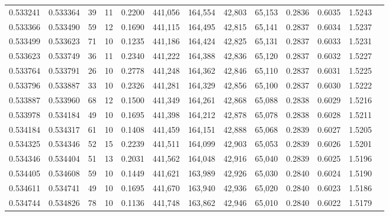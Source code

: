 \begin{tabular}{rrrrrrrrrrrrr}
0.533241 & 0.533364 &    39 &  11 &                                     0.2200 & 441,056 & 164,554 &  42,803 &  65,153 & 0.2836 & 0.6035 & 1.5243 \\
0.533366 & 0.533490 &    59 &  12 &                                     0.1690 & 441,115 & 164,495 &  42,815 &  65,141 & 0.2837 & 0.6034 & 1.5237 \\
0.533499 & 0.533623 &    71 &  10 &                                     0.1235 & 441,186 & 164,424 &  42,825 &  65,131 & 0.2837 & 0.6033 & 1.5231 \\
0.533623 & 0.533749 &    36 &  11 &                                     0.2340 & 441,222 & 164,388 &  42,836 &  65,120 & 0.2837 & 0.6032 & 1.5227 \\
0.533764 & 0.533791 &    26 &  10 &                                     0.2778 & 441,248 & 164,362 &  42,846 &  65,110 & 0.2837 & 0.6031 & 1.5225 \\
0.533796 & 0.533887 &    33 &  10 &                                     0.2326 & 441,281 & 164,329 &  42,856 &  65,100 & 0.2837 & 0.6030 & 1.5222 \\
0.533887 & 0.533960 &    68 &  12 &                                     0.1500 & 441,349 & 164,261 &  42,868 &  65,088 & 0.2838 & 0.6029 & 1.5216 \\
0.533978 & 0.534184 &    49 &  10 &                                     0.1695 & 441,398 & 164,212 &  42,878 &  65,078 & 0.2838 & 0.6028 & 1.5211 \\
0.534184 & 0.534317 &    61 &  10 &                                     0.1408 & 441,459 & 164,151 &  42,888 &  65,068 & 0.2839 & 0.6027 & 1.5205 \\
0.534325 & 0.534346 &    52 &  15 &                                     0.2239 & 441,511 & 164,099 &  42,903 &  65,053 & 0.2839 & 0.6026 & 1.5201 \\
0.534346 & 0.534404 &    51 &  13 &                                     0.2031 & 441,562 & 164,048 &  42,916 &  65,040 & 0.2839 & 0.6025 & 1.5196 \\
0.534405 & 0.534608 &    59 &  10 &                                     0.1449 & 441,621 & 163,989 &  42,926 &  65,030 & 0.2840 & 0.6024 & 1.5190 \\
0.534611 & 0.534741 &    49 &  10 &                                     0.1695 & 441,670 & 163,940 &  42,936 &  65,020 & 0.2840 & 0.6023 & 1.5186 \\
0.534744 & 0.534826 &    78 &  10 &                                     0.1136 & 441,748 & 163,862 &  42,946 &  65,010 & 0.2840 & 0.6022 & 1.5179 \\

\end{tabular}
